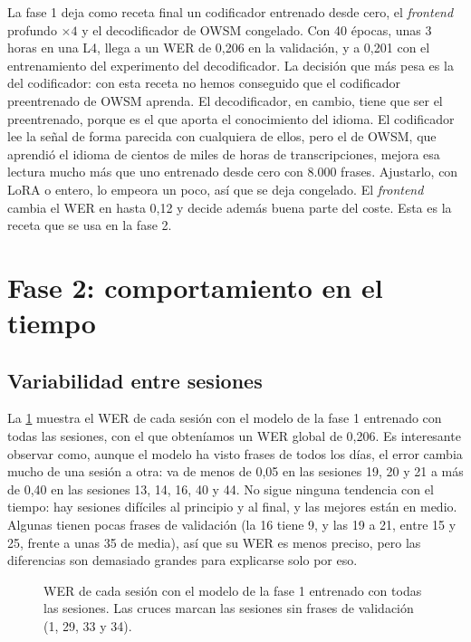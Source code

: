 La fase 1 deja como receta final un codificador entrenado desde cero, el \textit{frontend} profundo $\times 4$ y el decodificador de OWSM congelado. Con 40 épocas, unas 3 horas en una L4, llega a un WER de 0,206 en la validación, y a 0,201 con el entrenamiento del experimento del decodificador. La decisión que más pesa es la del codificador: con esta receta no hemos conseguido que el codificador preentrenado de OWSM aprenda. El decodificador, en cambio, tiene que ser el preentrenado, porque es el que aporta el conocimiento del idioma. El codificador lee la señal de forma parecida con cualquiera de ellos, pero el de OWSM, que aprendió el idioma de cientos de miles de horas de transcripciones, mejora esa lectura mucho más que uno entrenado desde cero con 8.000 frases. Ajustarlo, con LoRA o entero, lo empeora un poco, así que se deja congelado. El \textit{frontend} cambia el WER en hasta 0,12 y decide además buena parte del coste. Esta es la receta que se usa en la fase 2.
\section{Fase 2: comportamiento en el tiempo}
\label{sec:res-fase2}

\subsection{Variabilidad entre sesiones}
\label{sec:res-variabilidad}

La \cref{fig:res-wer-sesion} muestra el WER de cada sesión con el modelo de la fase 1 entrenado con todas las sesiones, con el que obteníamos un WER global de 0,206. Es interesante observar como, aunque el modelo ha visto frases de todos los días, el error cambia mucho de una sesión a otra: va de menos de 0,05 en las sesiones 19, 20 y 21 a más de 0,40 en las sesiones 13, 14, 16, 40 y 44. No sigue ninguna tendencia con el tiempo: hay sesiones difíciles al principio y al final, y las mejores están en medio. Algunas tienen pocas frases de validación (la 16 tiene 9, y las 19 a 21, entre 15 y 25, frente a unas 35 de media), así que su WER es menos preciso, pero las diferencias son demasiado grandes para explicarse solo por eso.

\begin{figure}[htbp]
  \centering
  \caption[WER en cada sesión]{WER de cada sesión con el modelo de la fase 1 entrenado con todas las sesiones. Las cruces marcan las sesiones sin frases de validación (1, 29, 33 y 34).}
  \label{fig:res-wer-sesion}
\end{figure}

